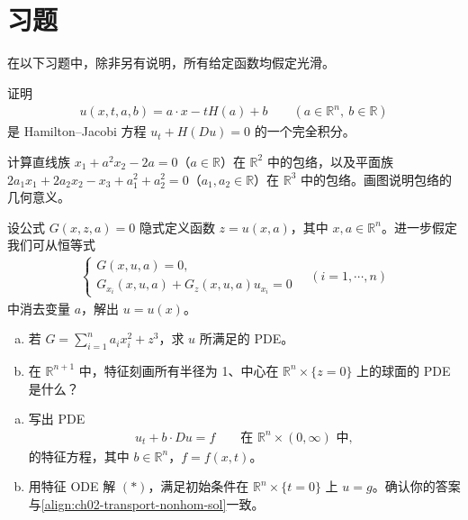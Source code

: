 \documentclass[../../main.tex]{subfiles}
\begin{document}
\section{习题}\label{section:ch03-exercises}

在以下习题中，除非另有说明，所有给定函数均假定光滑。

\begin{exercise}\label{exercise:ch03-1}
证明
\begin{align*}
u(x,t,a,b)=a\cdot x-tH(a)+b \qquad(a\in\mathbb{R}^n,\ b\in\mathbb{R})
\end{align*}
是 Hamilton--Jacobi 方程 $u_t+H(Du)=0$ 的一个完全积分。
\end{exercise}

\begin{exercise}\label{exercise:ch03-2}
计算直线族 $x_1+a^2x_2-2a=0$（$a\in\mathbb{R}$）在 $\mathbb{R}^2$ 中的包络，以及平面族 $2a_1x_1+2a_2x_2-x_3+a_1^2+a_2^2=0$（$a_1,a_2\in\mathbb{R}$）在 $\mathbb{R}^3$ 中的包络。画图说明包络的几何意义。
\end{exercise}

\begin{exercise}\label{exercise:ch03-3}
设公式 $G(x,z,a)=0$ 隐式定义函数 $z=u(x,a)$，其中 $x,a\in\mathbb{R}^n$。进一步假定我们可从恒等式
\begin{align*}
\begin{cases}
G(x,u,a)=0,\\
G_{x_i}(x,u,a)+G_z(x,u,a)u_{x_i}=0
\end{cases}\quad(i=1,\cdots,n)
\end{align*}
中消去变量 $a$，解出 $u=u(x)$。
\begin{enumerate}[(a)]
\item 若 $G=\sum_{i=1}^n a_i x_i^2+z^3$，求 $u$ 所满足的 PDE。
\item 在 $\mathbb{R}^{n+1}$ 中，特征刻画所有半径为 1、中心在 $\mathbb{R}^n\times\{z=0\}$ 上的球面的 PDE 是什么？
\end{enumerate}
\end{exercise}

\begin{exercise}\label{exercise:ch03-4}
\begin{enumerate}[(a)]
\item 写出 PDE
\begin{align*}
u_t+b\cdot Du=f \qquad\text{在 }\mathbb{R}^n\times(0,\infty)\text{ 中},
\end{align*}
的特征方程，其中 $b\in\mathbb{R}^n$，$f=f(x,t)$。
\item 用特征 ODE 解 $(*)$，满足初始条件在 $\mathbb{R}^n\times\{t=0\}$ 上 $u=g$。确认你的答案与\eqref{align:ch02-transport-nonhom-sol}一致。
\end{enumerate}
\end{exercise}
\end{document}
